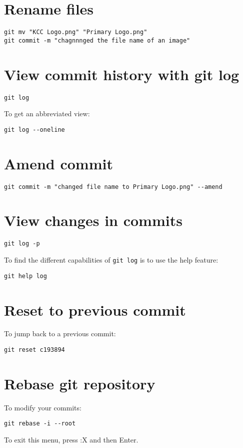 \documentclass[12pt]{article}
\begin{document}
\section{Rename files}
\begin{Verbatim}
git mv "KCC Logo.png" "Primary Logo.png"
git commit -m "chagnnnged the file name of an image"
\end{Verbatim}

\section{View commit history with git log}
\begin{Verbatim}
git log
\end{Verbatim}
To get an abbreviated view:
\begin{Verbatim}
git log --oneline
\end{Verbatim}

\section{Amend commit}
\begin{Verbatim}
git commit -m "changed file name to Primary Logo.png" --amend
\end{Verbatim}

\section{View changes in commits}
\begin{Verbatim}
git log -p
\end{Verbatim}
To find the different capabilities of \verb|git log| is to use the help feature:
\begin{Verbatim}
git help log
\end{Verbatim}


\section{Reset to previous commit}
To jump back to a previous commit:
\begin{Verbatim}
git reset c193894
\end{Verbatim}

\section{Rebase git repository}
To modify your commits:
\begin{Verbatim}
git rebase -i --root
\end{Verbatim}
To exit this menu, press :X and then Enter.
\end{document}

